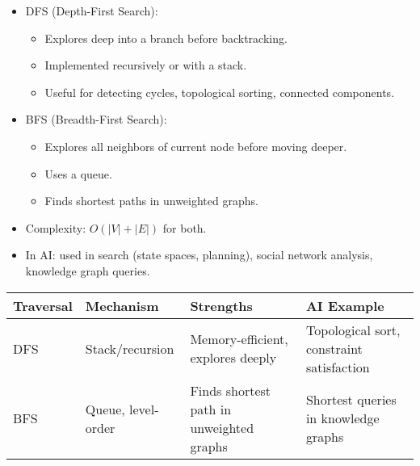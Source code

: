 \documentclass[
  letterpaper,
  DIV=11,
  numbers=noendperiod]{scrreprt}
\providecommand{\tightlist}{%
  \setlength{\itemsep}{0pt}\setlength{\parskip}{0pt}}
\begin{document}
\begin{itemize}
\item
  DFS (Depth-First Search):

  \begin{itemize}
  \tightlist
  \item
    Explores deep into a branch before backtracking.
  \item
    Implemented recursively or with a stack.
  \item
    Useful for detecting cycles, topological sorting, connected
    components.
  \end{itemize}
\item
  BFS (Breadth-First Search):

  \begin{itemize}
  \tightlist
  \item
    Explores all neighbors of current node before moving deeper.
  \item
    Uses a queue.
  \item
    Finds shortest paths in unweighted graphs.
  \end{itemize}
\item
  Complexity: \(O(|V| + |E|)\) for both.
\item
  In AI: used in search (state spaces, planning), social network
  analysis, knowledge graph queries.
\end{itemize}

\begin{longtable}[]{@{}
  >{\raggedright\arraybackslash}p{}
  >{\raggedright\arraybackslash}p{}
  >{\raggedright\arraybackslash}p{}
  >{\raggedright\arraybackslash}p{}@{}}
\toprule\noalign{}
\begin{minipage}[b]{\linewidth}\raggedright
Traversal
\end{minipage} & \begin{minipage}[b]{\linewidth}\raggedright
Mechanism
\end{minipage} & \begin{minipage}[b]{\linewidth}\raggedright
Strengths
\end{minipage} & \begin{minipage}[b]{\linewidth}\raggedright
AI Example
\end{minipage} \\
\midrule\noalign{}
\endhead
\bottomrule\noalign{}
\endlastfoot
DFS & Stack/recursion & Memory-efficient, explores deeply & Topological
sort, constraint satisfaction \\
BFS & Queue, level-order & Finds shortest path in unweighted graphs &
Shortest queries in knowledge graphs \\
\end{longtable}
\end{document}
